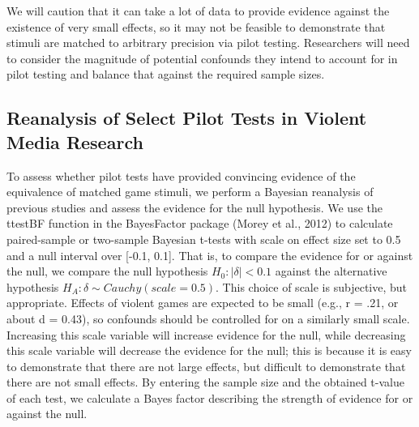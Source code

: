 \documentclass[fignum,nobf,man]{apa}
\begin{document}
We will caution that it can take a lot of data to provide evidence against the existence of very small effects, so it may not be feasible to demonstrate that stimuli are matched to arbitrary precision via pilot testing. Researchers will need to consider the magnitude of potential confounds they intend to account for in pilot testing and balance that against the required sample sizes.

\subsection{Reanalysis of Select Pilot Tests in Violent Media Research}
To assess whether pilot tests have provided convincing evidence of the equivalence of matched game stimuli, we perform a Bayesian reanalysis of previous studies and assess the evidence for the null hypothesis. We use the ttestBF function in the BayesFactor package (Morey et al., 2012) to calculate paired-sample or two-sample Bayesian t-tests with scale on effect size set to 0.5 and a null interval over [-0.1, 0.1]. That is, to compare the evidence for or against the null, we compare the null hypothesis $H_0: |\delta| < 0.1$ against the alternative hypothesis $H_A: \delta \sim Cauchy(scale = 0.5)$. This choice of scale is subjective, but appropriate. Effects of violent games are expected to be small (e.g., r = .21, or about d = 0.43), so confounds should be controlled for on a similarly small scale. Increasing this scale variable will increase evidence for the null, while decreasing this scale variable will decrease the evidence for the null; this is because it is easy to demonstrate that there are not large effects, but difficult to demonstrate that there are not small effects. By entering the sample size and the obtained t-value of each test, we calculate a Bayes factor describing the strength of evidence for or against the null.  
\end{document}
